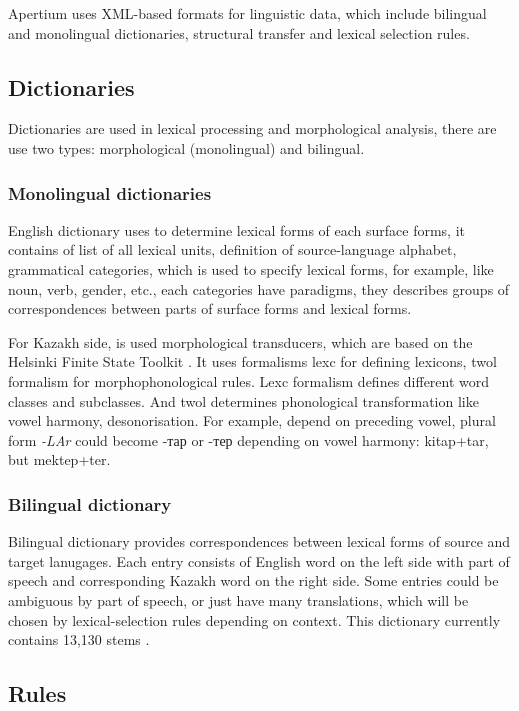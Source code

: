 \documentclass[11pt]{article}
\begin{document}
Apertium uses XML-based formats for linguistic data, which include bilingual and monolingual dictionaries, structural transfer and
lexical selection rules. %

\subsection{Dictionaries}

Dictionaries are used in lexical processing and morphological analysis, there are use two types: morphological (monolingual) and bilingual.

\subsubsection{Monolingual dictionaries}

English dictionary uses to determine lexical forms of each surface forms, it contains of list of all lexical units, definition 
of source-language alphabet, grammatical categories, which is used to specify lexical forms, for example, like noun, verb, 
gender, etc., each categories have paradigms, they describes groups of correspondences between parts of surface forms and lexical forms. 

For Kazakh side, is used morphological transducers, which are based on the Helsinki Finite State Toolkit \citep{hfst/2011}. It 
uses formalisms lexc for defining lexicons, twol formalism for morphophonological rules. Lexc formalism defines different 
word classes and subclasses. And twol determines phonological transformation like vowel harmony, desonorisation. For example, 
depend on preceding vowel, plural form \emph{-LAr} could become -тар or -тер depending on vowel harmony: kitap+tar, but mektep+ter.

\subsubsection{Bilingual dictionary}

Bilingual dictionary provides correspondences between lexical forms of source and target lanugages. Each entry 
consists of English word on the left side with part of speech and corresponding Kazakh word on the right side. 
Some entries could be ambiguous by part of speech, or just have many translations, which will be chosen by 
lexical-selection rules depending on context. This dictionary currently contains 13,130 stems \citep{sundetova13a}.


\subsection{Rules}
\end{document}
